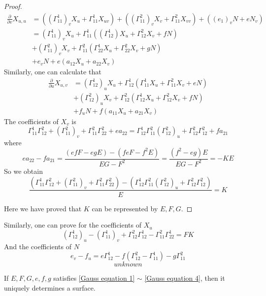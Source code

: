 \begin{proof}
    \begin{equation}
        \begin{aligned}
            \frac{\partial }{\partial v}X_{u,u}&=((\Gamma_{11}^1)_vX_u+\Gamma_{11}^1X_{uv})+((\Gamma_{11}^2)_vX_v+\Gamma_{11}^2X_{vv})+((e_1)_vN+eN_v)\\
            &=(\Gamma_{11}^1)_vX_u+\Gamma_{11}^1((\Gamma_{12}^1)X_u+\Gamma_{12}^2X_v+fN)\\
            &+(\Gamma_{11}^2)_vX_v+\Gamma_{11}^2(\Gamma_{22}^1X_u+\Gamma_{22}^2X_v+gN)\\
            &+e_vN+e(a_{12}X_u+a_{22}X_v)
        \end{aligned}
    \end{equation}
    Similarly, one can calculate that
    \begin{equation}
        \begin{aligned}
            \frac{\partial}{\partial u}X_{u,v}&=(\Gamma_{12}^1)_uX_u+\Gamma_{12}^1(\Gamma_{11}^1X_u+\Gamma_{11}^2X_v+eN)\\
            &+(\Gamma_{12}^2)_uX_v+\Gamma_{12}^2(\Gamma_{12}^1X_u+\Gamma_{12}^2X_v+fN)\\
            &+f_uN+f(a_{11}X_u+a_{21}X_v)
        \end{aligned}
    \end{equation}
    The coefficients of  $ X_v $ is 
    \[\Gamma_{11}^1\Gamma_{12}^2+(\Gamma_{11}^2)_v+\Gamma_{11}^2\Gamma_{22}^2+ea_{22}=\Gamma_{12}^1\Gamma_{11}^2(\Gamma_{12}^2)_u+\Gamma_{12}^2\Gamma_{12}^2+fa_{21}\]
    where 
    \[ea_{22}-fa_{21}=\frac{(efF-egE)-(feF-f^2E)}{EG-F^2}=\frac{(f^2-eg)E}{EG-F^2}=-KE\]
    So we obtain
    \begin{equation}\label{Gauss equation 1}
        \frac{(\Gamma_{11}^1\Gamma_{12}^2+(\Gamma_{11}^2)_v+\Gamma_{11}^2\Gamma_{22}^2)-(\Gamma_{12}^1\Gamma_{11}^2(\Gamma_{12}^2)_u+\Gamma_{12}^2\Gamma_{12}^2)}{E}=K
    \end{equation} 

    Here we have proved that  $ K  $ can be represented by  $ E,F,G $.
\end{proof}
Similarly, one can prove for the coefficients of  $ X_u $
    \begin{equation}
        (\Gamma_{12}^1)_u-(\Gamma_{11}^1)_v+\Gamma_{12}^2\Gamma_{12}^1-\Gamma_{11}^2\Gamma_{22}^1=FK
    \end{equation}
    And the coefficients of  $ N $
    \begin{equation}
        e_v-f_u=e\Gamma_{12}^1-f(\Gamma_{12}^2-\Gamma_{11}^1)-g\Gamma_{11}^2
    \end{equation} 
    \begin{equation}\label{Gauss equation 4}
        unknown
    \end{equation}
\begin{theorem}
    If  $ E,F,G,e,f,g $ satisfies \eqref{Gauss equation 1}  $ \sim $  \eqref{Gauss equation 4}, then it uniquely determines a surface.
\end{theorem}